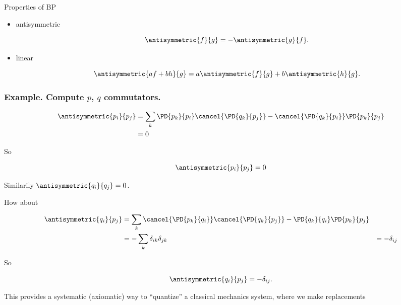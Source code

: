 Properties of BP

\begin{itemize}
\item antisymmetric

\begin{equation}\label{eqn:phaseSpaceAndTrajectories:n}
\antisymmetric{f}{g} = -\antisymmetric{g}{f}.
\end{equation}

\item linear

\begin{equation}\label{eqn:phaseSpaceAndTrajectories:n}
\antisymmetric{a f + b h}{g} =
a \antisymmetric{f}{g}
+ b\antisymmetric{h}{g}.
\end{equation}
\end{itemize}

\subsubsection{Example.  Compute $p$, $q$ commutators.}

\begin{align*}
\antisymmetric{p_i}{p_j} 
&= 
\sum_k
\PD{p_k}{p_i}
\cancel{
\PD{q_k}{p_j}
}
-
\cancel{
\PD{q_k}{p_i}
}
\PD{p_k}{p_j} \\
&= 0
\end{align*}

So 

\begin{equation}\label{eqn:phaseSpaceAndTrajectories:n}
\antisymmetric{p_i}{p_j} = 0
\end{equation}

Similarily $\antisymmetric{q_i}{q_j} = 0$.

How about

\begin{align*}
\antisymmetric{q_i}{p_j} 
&= 
\sum_k
\cancel{
\PD{p_k}{q_i}
}
\cancel{
\PD{q_k}{p_j}
}
-
\PD{q_k}{q_i}
\PD{p_k}{p_j} \\
&= 
-
\sum_k
\delta_{ik}
\delta_{jk}
&=
-\delta_{ij}
\end{align*}

So 

\begin{equation}\label{eqn:phaseSpaceAndTrajectories:n}
\antisymmetric{q_i}{p_j} = -\delta_{ij}.
\end{equation}

This provides a systematic (axiomatic) way to ``quantize'' a classical mechanics system, where we make replacements

